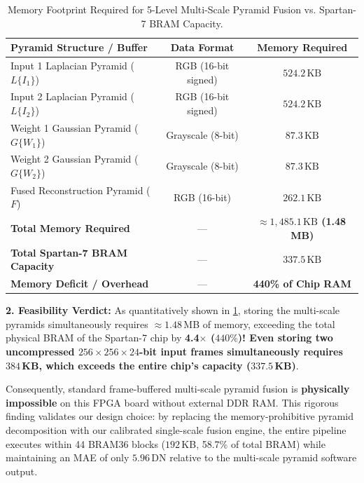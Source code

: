 \documentclass[10pt,twocolumn,letterpaper]{article}
\begin{document}
{\begin{table}[t]
  \centering
  \small
  \caption{Memory Footprint Required for 5-Level Multi-Scale Pyramid Fusion vs. Spartan-7 BRAM Capacity.}
  \label{tab:multiscale_memory}
  \begin{tabular}{@{}lcc@{}}
    \toprule
    \textbf{Pyramid Structure / Buffer} & \textbf{Data Format} & \textbf{Memory Required} \\
    \midrule
    Input 1 Laplacian Pyramid ($L\{I_1\}$) & RGB (16-bit signed) & $524.2\,\text{KB}$ \\
    Input 2 Laplacian Pyramid ($L\{I_2\}$) & RGB (16-bit signed) & $524.2\,\text{KB}$ \\
    Weight 1 Gaussian Pyramid ($G\{W_1\}$) & Grayscale (8-bit)  & $87.3\,\text{KB}$ \\
    Weight 2 Gaussian Pyramid ($G\{W_2\}$) & Grayscale (8-bit)  & $87.3\,\text{KB}$ \\
    Fused Reconstruction Pyramid ($F$)   & RGB (16-bit)        & $262.1\,\text{KB}$ \\
    \midrule
    \textbf{Total Memory Required}        & ---                 & \textbf{$\approx 1,485.1\,\text{KB}$ (1.48\,MB)} \\
    \textbf{Total Spartan-7 BRAM Capacity} & ---                 & \textbf{$337.5\,\text{KB}$} \\
    \midrule
    \textbf{Memory Deficit / Overhead}    & ---                 & \textbf{440\% of Chip RAM} \\
    \bottomrule
  \end{tabular}
\end{table}

\textbf{2. Feasibility Verdict:}
As quantitatively shown in \cref{tab:multiscale_memory}, storing the multi-scale pyramids simultaneously requires $\approx 1.48$\,MB of memory, exceeding the total physical BRAM of the Spartan-7 chip by \textbf{4.4$\times$ ($440\%$)! Even storing two uncompressed $256\times256\times24$-bit input frames simultaneously requires $384$\,KB, which exceeds the entire chip's capacity ($337.5$\,KB)}.

Consequently, standard frame-buffered multi-scale pyramid fusion is \textbf{physically impossible} on this FPGA board without external DDR RAM. This rigorous finding validates our design choice: by replacing the memory-prohibitive pyramid decomposition with our calibrated single-scale fusion engine, the entire pipeline executes within 44 BRAM36 blocks ($192$\,KB, 58.7\% of total BRAM) while maintaining an MAE of only $5.96$\,DN relative to the multi-scale pyramid software output.

}
\end{document}
